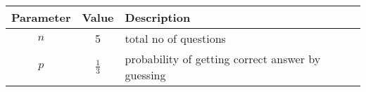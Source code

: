 

\begin{center}
\begin{tabular}{|c|c|l|}
\hline
 Parameter&  Value &Description\\ \hline
$n$ &  5 & total no of questions\\ \hline
 $p$ &  $\frac{1}{3}$ & probability of getting correct answer by guessing\\\hline

\end{tabular}
\end{center}